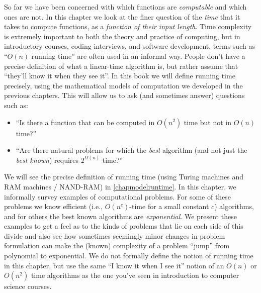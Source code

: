 So far we have been concerned with which functions are \emph{computable}
and which ones are not. In this chapter we look at the finer question of
the \emph{time} that it takes to compute functions, as a \emph{function
of their input length}. Time complexity is extremely important to both
the theory and practice of computing, but in introductory courses,
coding interviews, and software development, terms such as ``\(O(n)\)
running time'' are often used in an informal way. People don't have a
precise definition of what a linear-time algorithm is, but rather assume
that ``they'll know it when they see it''. In this book we will define
running time precisely, using the mathematical models of computation we
developed in the previous chapters. This will allow us to ask (and
sometimes answer) questions such as:

\begin{itemize}
\item
  ``Is there a function that can be computed in \(O(n^2)\) time but not
  in \(O(n)\) time?''
\item
  ``Are there natural problems for which the \emph{best} algorithm (and
  not just the \emph{best known}) requires \(2^{\Omega(n)}\) time?''
\end{itemize}

\hypertarget{runtimefunc}{}

We will see the precise definition of running time (using Turing
machines and RAM machines / NAND-RAM) in \cref{chapmodelruntime}. In
this chapter, we informally survey examples of computational problems.
For some of these problems we know efficient (i.e., \(O(n^c)\)-time for
a small constant \(c\)) algorithms, and for others the best known
algorithms are \emph{exponential}. We present these examples to get a
feel as to the kinds of problems that lie on each side of this divide
and also see how sometimes seemingly minor changes in problem
formulation can make the (known) complexity of a problem ``jump'' from
polynomial to exponential. We do not formally define the notion of
running time in this chapter, but use the same ``I know it when I see
it'' notion of an \(O(n)\) or \(O(n^2)\) time algorithms as the one
you've seen in introduction to computer science courses.

